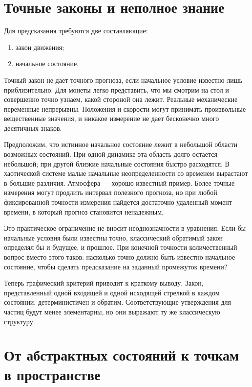 \section{Точные законы и неполное знание}

Для предсказания требуются две составляющие:
\begin{enumerate}
  \item закон движения;
  \item начальное состояние.
\end{enumerate}
Точный закон не дает точного прогноза, если начальное условие известно лишь приблизительно. Для монеты легко представить, что мы смотрим на стол и совершенно точно узнаем, какой стороной она лежит. Реальные механические переменные непрерывны. Положения и скорости могут принимать произвольные вещественные значения, и никакое измерение не дает бесконечно много десятичных знаков.

Предположим, что истинное начальное состояние лежит в небольшой области возможных состояний. При одной динамике эта область долго остается небольшой; при другой близкие начальные состояния быстро расходятся. В хаотической системе малые начальные неопределенности со временем вырастают в большие различия. Атмосфера — хорошо известный пример. Более точные измерения могут продлить интервал полезного прогноза, но при любой фиксированной точности измерения найдется достаточно удаленный момент времени, в который прогноз становится ненадежным.

Это практическое ограничение не вносит неоднозначности в уравнения. Если бы начальные условия были известны точно, классический обратимый закон определял бы и будущее, и прошлое. При конечной точности количественный вопрос вместо этого таков: насколько точно должно быть известно начальное состояние, чтобы сделать предсказание на заданный промежуток времени?

Теперь графический критерий приводит к краткому выводу. Закон, представленный одной входящей и одной исходящей стрелкой в каждом состоянии, детерминистичен и обратим. Соответствующие утверждения для частиц будут менее элементарны, но они выражают ту же классическую структуру.

\section{От абстрактных состояний к точкам в пространстве}

